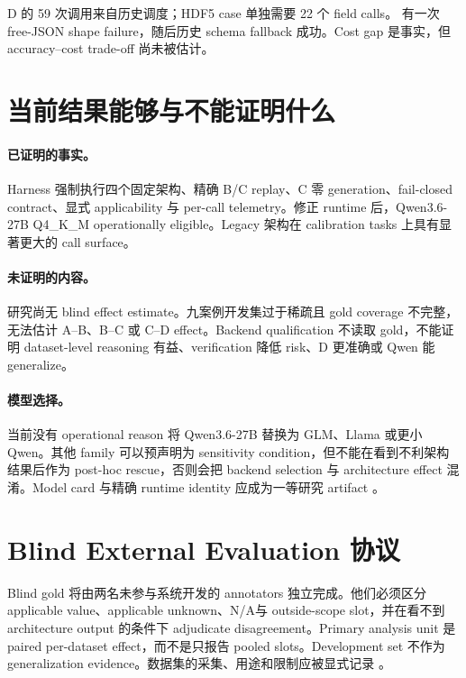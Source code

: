 \documentclass[UTF8,fontset=fandol,11pt]{ctexart}
\newcommand{\NA}{\textsf{N/A}}
\begin{document}
D 的 59 次调用来自历史调度；HDF5 case 单独需要 22 个 field calls。 有一次 free-JSON shape failure，随后历史 schema fallback 成功。Cost gap 是事实，但 accuracy--cost trade-off 尚未被估计。

\section{当前结果能够与不能证明什么}

\paragraph{已证明的事实。}
Harness 强制执行四个固定架构、精确 B/C replay、C 零 generation、fail-closed contract、显式 applicability 与 per-call telemetry。修正 runtime 后，Qwen3.6-27B Q4\_K\_M operationally eligible。Legacy 架构在 calibration tasks 上具有显著更大的 call surface。

\paragraph{未证明的内容。}
研究尚无 blind effect estimate。九案例开发集过于稀疏且 gold coverage 不完整，无法估计 A--B、B--C 或 C--D effect。Backend qualification 不读取 gold，不能证明 dataset-level reasoning 有益、verification 降低 risk、D 更准确或 Qwen 能 generalize。

\paragraph{模型选择。}
当前没有 operational reason 将 Qwen3.6-27B 替换为 GLM、Llama 或更小 Qwen。其他 family 可以预声明为 sensitivity condition，但不能在看到不利架构结果后作为 post-hoc rescue，否则会把 backend selection 与 architecture effect 混淆。Model card 与精确 runtime identity 应成为一等研究 artifact \cite{mitchell2019modelcards}。

\section{Blind External Evaluation 协议}

Blind gold 将由两名未参与系统开发的 annotators 独立完成。他们必须区分 applicable value、applicable unknown、\NA 与 outside-scope slot，并在看不到 architecture output 的条件下 adjudicate disagreement。Primary analysis unit 是 paired per-dataset effect，而不是只报告 pooled slots。Development set 不作为 generalization evidence。数据集的采集、用途和限制应被显式记录 \cite{gebru2021datasheets}。
\end{document}
